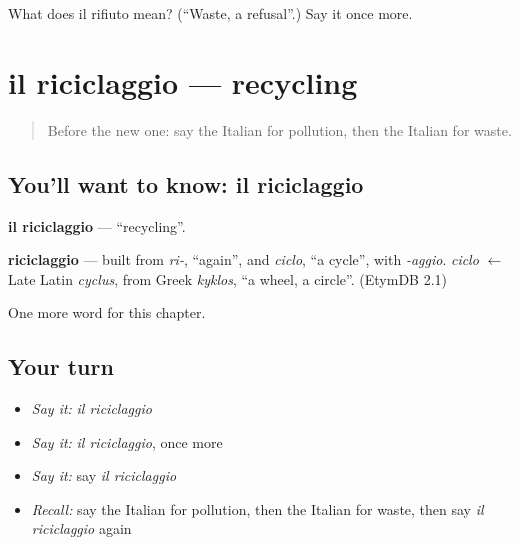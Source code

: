 \begin{tcolorbox}[breakable,colback=teal!4,colframe=teal!35!black,title={Before you move on}]
What does il rifiuto mean? (\textquotedblleft{}Waste, a refusal\textquotedblright{}.) Say it once more.
\end{tcolorbox}
\section[il riciclaggio]{il riciclaggio — recycling}

\label{lesson:IT-C169-riciclaggio}



\begin{quote}
Before the new one: say the Italian for pollution, then the Italian for waste.
\end{quote}

\subsection*{You'll want to know: il riciclaggio}
\textbf{il riciclaggio} — \textquotedblleft{}recycling\textquotedblright{}.

\begin{cousinweb}
\textbf{riciclaggio} — built from \emph{ri-}, \textquotedblleft{}again\textquotedblright{}, and \emph{ciclo}, \textquotedblleft{}a cycle\textquotedblright{}, with \emph{-aggio}. \emph{ciclo} $\leftarrow$ Late Latin \emph{cyclus}, from Greek \emph{kyklos}, \textquotedblleft{}a wheel, a circle\textquotedblright{}. (EtymDB 2.1)
\end{cousinweb}

\begin{grammarlens}[title={What you've built}]
One more word for this chapter.
\end{grammarlens}

\subsection*{Your turn}
\begin{itemize}
\raggedright
  \item \emph{Say it:} \emph{il riciclaggio}
  \item \emph{Say it:} \emph{il riciclaggio}, once more
  \item \emph{Say it:} say \emph{il riciclaggio}
  \item \emph{Recall:} say the Italian for pollution, then the Italian for waste, then say \emph{il riciclaggio} again
\end{itemize}

